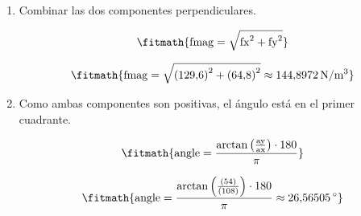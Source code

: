 \begin{enumerate}
\item Combinar las dos componentes perpendiculares.

\[\fitmath{\mathrm{fmag}=\sqrt{{\mathrm{fx}}^{2}+{\mathrm{fy}}^{2}}}\]

\[\fitmath{\mathrm{fmag}=\sqrt{{(129{,}6)}^{2}+{(64{,}8)}^{2}}\approx 144{,}8972\,\mathrm{N/m^{3}}}\]

\item Como ambas componentes son positivas, el ángulo está en el primer cuadrante.

\[\fitmath{\mathrm{angle}=\frac{\arctan\left(\frac{\mathrm{ay}}{\mathrm{ax}}\right)\cdot 180}{\pi}}\]

\[\fitmath{\mathrm{angle}=\frac{\arctan\left(\frac{(54)}{(108)}\right)\cdot 180}{\pi}\approx 26{,}56505\,{}^{\circ}}\]

\end{enumerate}
